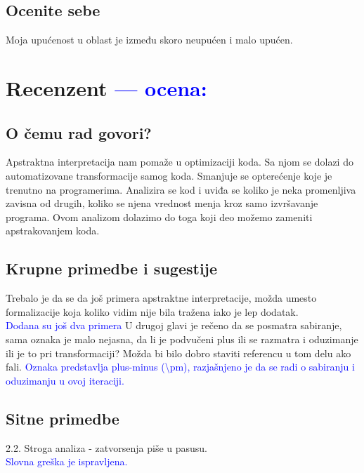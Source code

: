 \documentclass[a4paper]{report}
\newcommand{\odgovor}[1]{\textcolor{blue}{#1}}
\begin{document}
\section{Ocenite sebe}
Moja upućenost u oblast je između skoro neupućen i malo upućen.

\chapter{Recenzent \odgovor{--- ocena:} }


\section{O čemu rad govori?}
Apstraktna interpretacija nam pomaže u optimizaciji koda. Sa njom se dolazi do automatizovane transformacije samog koda. Smanjuje se opterećenje koje je trenutno na programerima. Analizira se kod i uviđa se koliko je neka promenljiva zavisna od drugih, koliko se njena vrednost menja kroz samo izvršavanje programa. Ovom analizom dolazimo do toga koji deo možemo zameniti apstrakovanjem koda. 

\section{Krupne primedbe i sugestije}
Trebalo je da se da još primera apstraktne interpretacije, možda umesto formalizacije koja koliko vidim nije bila tražena iako je lep dodatak.\\
\odgovor{Dodana su još dva primera}
U drugoj glavi je rečeno da se posmatra sabiranje, sama oznaka je malo nejasna, da li je podvučeni plus ili se razmatra i oduzimanje ili je to pri transformaciji? Možda bi bilo dobro staviti referencu u tom delu ako fali. 
\odgovor{Oznaka predstavlja plus-minus (\textbackslash pm), razjašnjeno je da se radi o sabiranju i oduzimanju u ovoj iteraciji.}

\section{Sitne primedbe}
2.2. Stroga analiza - zatvorsenja piše u pasusu. \\
\odgovor{Slovna greška je ispravljena.}
\\
\end{document}

